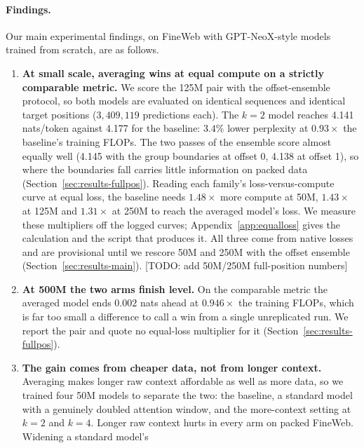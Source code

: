 \documentclass[11pt]{article}
\newcommand{\todo}[1]{\textcolor{warnred}{[TODO: #1]}}
\begin{document}
\paragraph{Findings.}
Our main experimental findings, on FineWeb with GPT-NeoX-style models
trained from scratch, are as follows.

\begin{enumerate}
  \item \textbf{At small scale, averaging wins at equal compute on a
        strictly comparable metric.} We score the 125M pair with the
        offset-ensemble protocol, so both models are evaluated on identical
        sequences and identical target positions ($3{,}409{,}119$
        predictions each). The $k{=}2$ model reaches 4.141 nats/token
        against 4.177 for the baseline: $3.4\%$ lower perplexity at
        $0.93\times$ the baseline's training FLOPs. The two passes of the
        ensemble score almost equally well (4.145 with the group boundaries
        at offset 0, 4.138 at offset 1), so where the boundaries fall
        carries little information on packed data
        (Section~\ref{sec:results-fullpos}). Reading each family's
        loss-versus-compute curve at equal loss, the baseline needs
        $1.48\times$ more compute at 50M, $1.43\times$ at 125M and
        $1.31\times$ at 250M to reach the averaged model's loss. We measure
        these multipliers off the logged curves; Appendix~\ref{app:equalloss}
        gives the calculation and the script that produces it. All three come
        from native losses and are provisional until we rescore 50M and 250M
        with the offset ensemble (Section~\ref{sec:results-main}).
        \todo{add 50M/250M full-position numbers}
  \item \textbf{At 500M the two arms finish level.} On the comparable metric
        the averaged model ends $0.002$ nats ahead at $0.946\times$ the
        training FLOPs, which is far too small a difference to call a win
        from a single unreplicated run. We report the pair and quote no
        equal-loss multiplier for it (Section~\ref{sec:results-fullpos}).
  \item \textbf{The gain comes from cheaper data, not from longer context.}
        Averaging makes longer raw context affordable as well as more data,
        so we trained four 50M models to separate the two: the baseline, a
        standard model with a genuinely doubled attention window, and the
        more-context setting at $k{=}2$ and $k{=}4$. Longer raw context
        hurts in every arm on packed FineWeb. Widening a standard model's

\end{enumerate}
\end{document}
